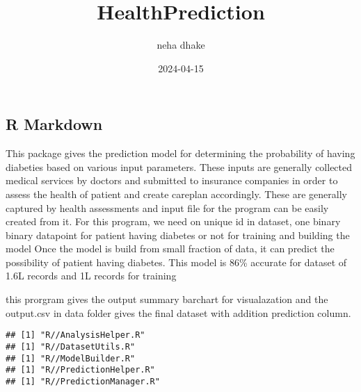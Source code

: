 \documentclass[
]{article}
\title{HealthPrediction}
\author{neha dhake}
\date{2024-04-15}
\newenvironment{Shaded}{\begin{snugshade}}{\end{snugshade}}
\newcommand{\AttributeTok}[1]{\textcolor[rgb]{0.13,0.29,0.53}{#1}}
\newcommand{\CommentTok}[1]{\textcolor[rgb]{0.56,0.35,0.01}{\textit{#1}}}
\newcommand{\ConstantTok}[1]{\textcolor[rgb]{0.56,0.35,0.01}{#1}}
\newcommand{\ControlFlowTok}[1]{\textcolor[rgb]{0.13,0.29,0.53}{\textbf{#1}}}
\newcommand{\FunctionTok}[1]{\textcolor[rgb]{0.13,0.29,0.53}{\textbf{#1}}}
\newcommand{\NormalTok}[1]{#1}
\newcommand{\OtherTok}[1]{\textcolor[rgb]{0.56,0.35,0.01}{#1}}
\newcommand{\SpecialCharTok}[1]{\textcolor[rgb]{0.81,0.36,0.00}{\textbf{#1}}}
\newcommand{\StringTok}[1]{\textcolor[rgb]{0.31,0.60,0.02}{#1}}
\begin{document}
\maketitle

\hypertarget{r-markdown}{%
\subsection{R Markdown}\label{r-markdown}}

This package gives the prediction model for determining the probability
of having diabeties based on various input parameters. These inputs are
generally collected medical services by doctors and submitted to
insurance companies in order to assess the health of patient and create
careplan accordingly. These are generally captured by health assessments
and input file for the program can be easily created from it. For this
program, we need on unique id in dataset, one binary binary datapoint
for patient having diabetes or not for training and building the model
Once the model is build from small fraction of data, it can predict the
possibility of patient having diabetes. This model is 86\% accurate for
dataset of 1.6L records and 1L records for training

this prorgram gives the output summary barchart for visualazation and
the output.csv in data folder gives the final dataset with addition
prediction column.

\begin{Shaded}
\end{Shaded}

\begin{verbatim}
## [1] "R//AnalysisHelper.R"
## [1] "R//DatasetUtils.R"
## [1] "R//ModelBuilder.R"
## [1] "R//PredictionHelper.R"
## [1] "R//PredictionManager.R"
\end{verbatim}
\end{document}
